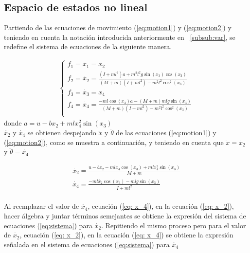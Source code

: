 \documentclass{ieeeaccess}
\begin{document}
\subsection{Espacio de estados no lineal}

Partiendo de las ecuaciones de movimiento (\ref{eq:motion1}) y
(\ref{eq:motion2}) y teniendo en cuenta la notación introducida anteriormente en
~\ref{subsub:var}, se redefine el sistema de ecuaciones de la siguiente
manera.

\begin{eqnarray}
  \label{eq:sistema}
  \left\{
  \begin{array}{ll}
    f_1 = \displaystyle\dot{x_1} = \displaystyle x_2 \\
    f_2 = \displaystyle\dot{x_2} =
            \displaystyle\frac{(I + ml^2)a + m^2l^2g\sin(x_3)\cos(x_3)}
              {(M + m)(I + ml^2)-m^2l^2\cos^2(x_3)}\\
    f_3 = \displaystyle\dot{x_3} = \displaystyle x_4\\
    f_4 = \dot{x_4} = \displaystyle\frac{-ml\cos(x_3)a - (M + m)mlg\sin(x_3)}
                         {(M + m)(I + ml^2) - m^2l^2\cos^2(x_3)}\\
  \end{array}
  \right.
\end{eqnarray}
donde $a = u-bx_2+mlx_4^2\sin(x_3)$\\

$\dot{x_2}$ y $\dot{x_4}$ se obtienen despejando $\ddot{x}$ y $\ddot{\theta}$ de
las ecuaciones (\ref{eq:motion1}) y (\ref{eq:motion2}), como se muestra a
continuación, y teniendo en cuenta que $\ddot{x}=\dot{x_2}$ y
$\ddot{\theta}=\dot{x_4}$

\begin{eqnarray}
  \label{eq: x_2}
  \dot{x_2} = \displaystyle\frac{u - bx_2 - ml\dot{x_4}\cos(x_3)
    + mlx_4^2\sin(x_3)}{M+m}\\
  \label{eq: x_4}
  \dot{x_4} = \displaystyle\frac{-ml\dot{x_2}\cos(x_3) - mlg\sin(x_3)}{I + ml^2}
\end{eqnarray}\\

Al reemplazar el valor de $\dot{x_4}$, ecuación (\ref{eq: x_4}), en la ecuación
(\ref{eq: x_2}), hacer álgebra y juntar términos semejantes se obtiene la
expresión del sistema de ecuaciones (\ref{eq:sistema}) para $\dot{x_2}$.
Repitiendo el mismo proceso pero para el valor de $\dot{x_2}$, ecuación
(\ref{eq: x_2}), en la ecuación (\ref{eq: x_4}) se obtiene la expresión
señalada en el sistema de ecuaciones (\ref{eq:sistema}) para $\dot{x_4}$
\end{document}
